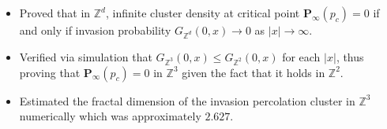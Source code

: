 


\begin{itemize}[nosep]
  \item Proved that in $\mathbb{Z}^d$, infinite cluster density at critical point $\mathbf{P}_{\infty}(p_c)=0$ if and only if invasion probability $G_{\mathbb{Z}^d}(0,x)\rightarrow0$ as $|x|\rightarrow\infty$.
  \item Verified via simulation that $G_{\mathbb{Z}^3}(0,x)\leq G_{\mathbb{Z}^2}(0,x)$ for each $|x|$, thus proving that $\mathbf{P}_{\infty}(p_c)=0$ in $\mathbb{Z}^3$ given the fact that it holds in $\mathbb{Z}^2$.
  \item Estimated the fractal dimension of the invasion percolation cluster in $\mathbb{Z}^3$ numerically which was approximately $2.627$.
\end{itemize}
